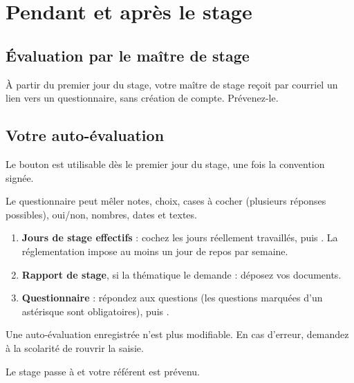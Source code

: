 \documentclass[11pt,a4paper]{article}
\begin{document}
\section{Pendant et après le stage}

\subsection{Évaluation par le maître de stage}

À partir du premier jour du stage, votre maître de stage reçoit par courriel un
lien vers un questionnaire, sans création de compte. Prévenez-le.

\subsection{Votre auto-évaluation}

Le bouton  est utilisable dès le premier jour du
stage, une fois la convention signée.


Le questionnaire peut mêler notes, choix, cases à cocher (plusieurs réponses
possibles), oui/non, nombres, dates et textes.


\begin{enumerate}
  \item \textbf{Jours de stage effectifs} : cochez les jours réellement
        travaillés, puis . La réglementation impose au moins
        un jour de repos par semaine.
  \item \textbf{Rapport de stage}, si la thématique le demande : déposez vos
        documents.
  \item \textbf{Questionnaire} : répondez aux questions (les questions marquées
        d'un astérisque sont obligatoires), puis .
\end{enumerate}

\begin{attention}
Une auto-évaluation enregistrée n'est plus modifiable. En cas d'erreur, demandez
à la scolarité de rouvrir la saisie.
\end{attention}

Le stage passe à  et votre référent est prévenu.
\end{document}
